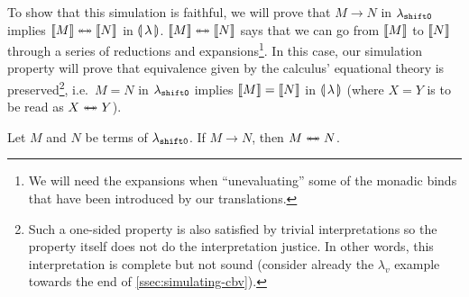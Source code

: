 To show that this simulation is faithful, we will prove that $M \to N$ in
$\lambda_{\mathtt{shift0}}$ implies $\llbracket M \rrbracket \twoheadleftarrow \mathrel{\mkern-15mu} \twoheadrightarrow \llbracket N \rrbracket$ in
$\llparenthesis \, \lambda \, \rrparenthesis$. $\llbracket M \rrbracket \twoheadleftarrow \mathrel{\mkern-15mu} \twoheadrightarrow \llbracket N \rrbracket$ says that we can go from
$\llbracket M \rrbracket$ to $\llbracket N \rrbracket$ through a series of reductions and
expansions\footnote{We will need the expansions when ``unevaluating'' some
  of the monadic binds that have been introduced by our translations.}. In
this case, our simulation property will prove that equivalence given by the
calculus' equational theory is preserved\footnote{Such a one-sided property
  is also satisfied by trivial interpretations so the property itself does
  not do the interpretation justice. In other words, this interpretation is
  complete but not sound (consider already the $\lambda_v$ example towards
  the end of \ref{ssec:simulating-cbv}). }, i.e.\ $M = N$ in $\lambda_{\mathtt{shift0}}$ implies $\llbracket M \rrbracket
= \llbracket N \rrbracket$ in $\llparenthesis \, \lambda \, \rrparenthesis$ (where $X = Y$ is to be read as $X
\twoheadleftarrow \mathrel{\mkern-15mu} \twoheadrightarrow Y$).

\begin{property}
  Let $M$ and $N$ be terms of $\lambda_{\mathtt{shift0}}$. If $M \to N$, then $M
  \twoheadleftarrow \mathrel{\mkern-15mu} \twoheadrightarrow N$.
\end{property}

